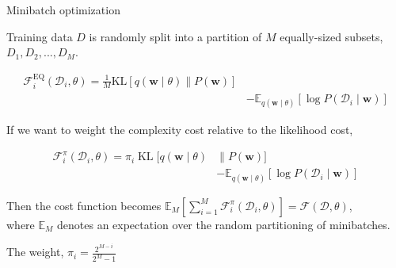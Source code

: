 \documentclass[8pt,xcolor=dvipsnames,compress]{beamer}
\begin{document}
\begin{frame}{Minibatch optimization}

Training data $D$ is randomly split into a partition of $M$ equally-sized subsets, $D_1,D_2,...,D_M$.

\begin{equation}
\begin{aligned}
\mathcal{F}_{i}^{\mathrm{EQ}}\left(\mathcal{D}_{i}, \theta\right)=\frac{1}{M} \mathrm{KL}[q(\mathbf{w} \mid \theta) \| P(\mathbf{w})] & \\
& -\mathbb{E}_{q(\mathbf{w} \mid \theta)}\left[\log P\left(\mathcal{D}_{i} \mid \mathbf{w}\right)\right]
\end{aligned}
\end{equation}

If we want to weight the complexity cost relative to the likelihood cost, 

\begin{equation}
\begin{aligned}
\mathcal{F}_{i}^{\pi}\left(\mathcal{D}_{i}, \theta\right)=\pi_{i} \operatorname{KL}[q(\mathbf{w} \mid \theta) & \| P(\mathbf{w})] \\
& -\mathbb{E}_{q(\mathbf{w} \mid \theta)}\left[\log P\left(\mathcal{D}_{i} \mid \mathbf{w}\right)\right]
\end{aligned}
\end{equation}

Then the cost function becomes $\mathbb{E}_{M}\left[\sum_{i=1}^{M} \mathcal{F}_{i}^{\pi}\left(\mathcal{D}_{i}, \theta\right)\right]=\mathcal{F}(\mathcal{D}, \theta)$,\\
where $\mathbb{E}_{M}$ denotes an expectation over the random partitioning of minibatches.

The weight, $\pi_{i}=\frac{2^{M-i}}{2^{M}-1}$
\end{frame}
\end{document}
